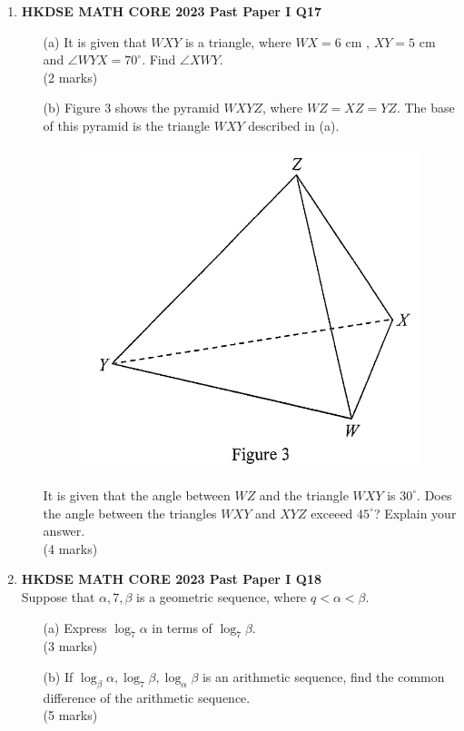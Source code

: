 \documentclass[12pt]{article}
\begin{document}
\begin{enumerate}
	\item \textbf{HKDSE MATH CORE 2023 Past Paper I Q17}
	\begin{enumerate}
		\item[(a)] It is given that $WXY$ is a triangle, where $WX = 6$ cm , $XY = 5$ cm and $\angle WYX = 70^\circ$. Find $\angle XWY$. \\(2 marks)
		\item[(b)] Figure 3 shows the pyramid $WXYZ$, where $WZ = XZ = YZ$. The base of this pyramid is the triangle $WXY$ described in (a).
		\begin{figure}[H]
			\centering
			\includegraphics[width = .3\linewidth]{2023Figure1.3}
		\end{figure}
		It is given that the angle between $WZ$ and the triangle $WXY$ is $30^\circ$. Does the angle between the triangles $WXY$ and $XYZ$ exceeed $45^\circ$? Explain your answer. \\(4 marks)
	\end{enumerate}

	\item \textbf{HKDSE MATH CORE 2023 Past Paper I Q18}\\
	Suppose that $\alpha , 7 , \beta $ is a geometric sequence, where $q < \alpha < \beta$.
	\begin{enumerate}
		\item[(a)] Express $\log_7{\alpha}$ in terms of $\log_7{\beta}$. \\(3 marks)
		\item[(b)] If $\log_{\beta}{\alpha}, \log_{7}{\beta}, \log_{\alpha}{\beta}$ is an arithmetic sequence, find the common difference of the arithmetic sequence. \\(5 marks)
	\end{enumerate}


\end{enumerate}
\end{document}

